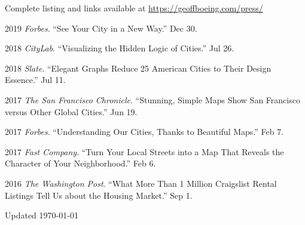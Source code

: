 \documentclass[12pt,letterpaper]{report}
\begin{document}
    Complete listing and links available at \href{https://geoffboeing.com/press/}{https://geoffboeing.com/press/} \bigskip

    \begin{tablist}

        \item[2019] \tab \textit{Forbes}. \enquote{See Your City in a New Way.} Dec 30.

        \item[2018] \tab \textit{CityLab}. \enquote{Visualizing the Hidden Logic of Cities.} Jul 26.

        \item[2018] \tab \textit{Slate}. \enquote{Elegant Graphs Reduce 25 American Cities to Their Design Essence.} Jul 11.

        \item[2017] \tab \textit{The San Francisco Chronicle}. \enquote{Stunning, Simple Maps Show San Francisco versus Other Global Cities.} Jun 19.

        \item[2017] \tab \textit{Forbes}. \enquote{Understanding Our Cities, Thanks to Beautiful Maps.} Feb 7.

        \item[2017] \tab \textit{Fast Company}. \enquote{Turn Your Local Streets into a Map That Reveals the Character of Your Neighborhood.} Feb 6.

        \item[2016] \tab \textit{The Washington Post}. \enquote{What More Than 1 Million Craigslist Rental Listings Tell Us about the Housing Market.} Sep 1.

    \end{tablist}



    \begin{center}
        \vfill
        Updated \monthyeardate\today
    \end{center}
\end{document}

